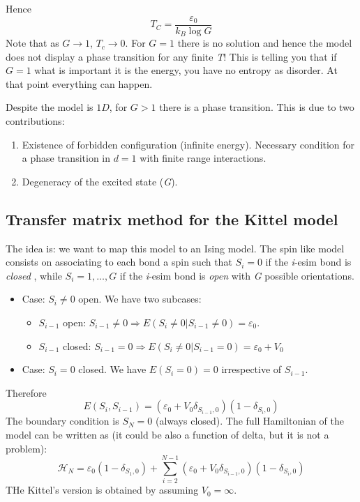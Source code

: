 \documentclass[../main/main.tex]{subfiles}
\begin{document}
Hence
\begin{equation}
  T_C = \frac{\varepsilon _0}{k_B \log{G} }
\end{equation}
Note that as \( G \rightarrow 1 \), \( T_c \rightarrow 0 \). For \( G=1 \) there is no solution and hence the model does not display a phase transition for any finite \emph{T}! This is telling you that if \( G=1 \) what is important it is the energy, you have no entropy as disorder. At that point everything can happen.
\begin{remark}
Despite the model is \( 1D \), for \( G>1 \) there is a phase transition. This is due to two contributions:
\begin{enumerate}
\item Existence of forbidden configuration (infinite energy). Necessary condition for a phase transition in \( d=1 \) with finite range interactions.
\item Degeneracy of the excited state (\emph{G}).
\end{enumerate}
\end{remark}

\subsection{Transfer matrix method for the Kittel model}
The idea is: we want to map this model to an Ising model. The spin like model consists on associating to each bond a spin such that \( S_i = 0 \) if the \emph{i}-esim bond is \emph{closed} , while \( S_i = 1, \dots, G \) if the \emph{i}-esim bond is \emph{open} with \emph{G} possible orientations.
\begin{itemize}
  \item Case: \( S_i \neq 0 \) open. We have two subcases:
  \begin{itemize}
  \item \( S_{i-1}\) open: \( S_{i-1} \neq 0 \Rightarrow E (S_i \neq 0 | S_{i-1} \neq 0) = \varepsilon _0\).
  \item \( S_{i-1}\) closed: \( S_{i-1} = 0 \Rightarrow  E (S_i \neq 0 | S_{i-1} = 0) = \varepsilon _0 + V_0 \)
  \end{itemize}
\item Case: \( S_i = 0 \) closed. We have \( E (S_i=0)=0 \) irrespective of \( S_{i-1} \).
\end{itemize}
Therefore
\begin{equation}
  E ( S_i, S_{i-1}) = ( \varepsilon _0 + V_0 \delta _{S_{i-1},0}) (1- \delta _{S_i,0})
\end{equation}
The boundary condition is \( S_N =0 \) (always closed).
The full Hamiltonian of the model can be written as (it could be also a function of delta, but it is not a problem):
\begin{equation}
  \mathcal{H}_N = \varepsilon _0 (1- \delta _{S_1,0}) + \sum_{i=2}^{N-1} (\varepsilon _0 + V_0 \delta _{S_{i-1},0})(1- \delta _{S_i,0})
\end{equation}
THe Kittel's version is obtained by assuming \( V_0 = \infty  \).
\end{document}
